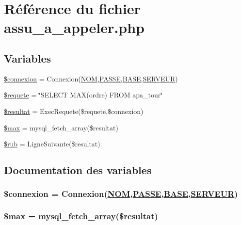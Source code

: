 \hypertarget{assu__a__appeler_8php}{
\section{R\'{e}f\'{e}rence du fichier assu\_\-a\_\-appeler.php}
\label{assu__a__appeler_8php}
}
\subsection*{Variables}
\begin{CompactItemize}
\item 
\hyperlink{assu__a__appeler_8php_a0}{\$connexion} = Connexion(\hyperlink{pma__connect_8php_a0}{NOM},\hyperlink{pma__connect_8php_a1}{PASSE},\hyperlink{pma__connect_8php_a3}{BASE},\hyperlink{pma__connect_8php_a2}{SERVEUR})
\item 
\hyperlink{assu__a__appeler_8php_a1}{\$requete} = \char`\"{}SELECT MAX(ordre) FROM apa\_\-tour\char`\"{}
\item 
\hyperlink{assu__a__appeler_8php_a2}{\$resultat} = Exec\-Requete(\$requete,\$connexion)
\item 
\hyperlink{assu__a__appeler_8php_a3}{\$max} = mysql\_\-fetch\_\-array(\$resultat)
\item 
\hyperlink{assu__a__appeler_8php_a4}{\$rub} = Ligne\-Suivante(\$resultat)
\end{CompactItemize}


\subsection{Documentation des variables}
\hypertarget{assu__a__appeler_8php_a0}{
\subsubsection[\$connexion]{\setlength{\rightskip}{0pt plus 5cm}\$connexion = Connexion(\hyperlink{pma__connect_8php_a0}{NOM},\hyperlink{pma__connect_8php_a1}{PASSE},\hyperlink{pma__connect_8php_a3}{BASE},\hyperlink{pma__connect_8php_a2}{SERVEUR})}}
\label{assu__a__appeler_8php_a0}


\hypertarget{assu__a__appeler_8php_a3}{
\subsubsection[\$max]{\setlength{\rightskip}{0pt plus 5cm}\$max = mysql\_\-fetch\_\-array(\$resultat)}}
\label{assu__a__appeler_8php_a3}


